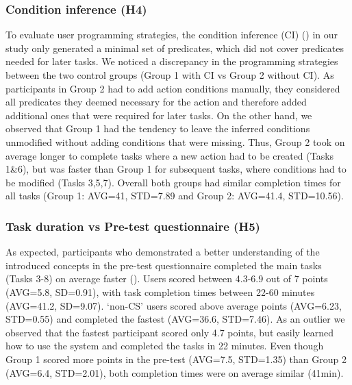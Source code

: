 \subsubsection*{Condition inference (H4)} 
To evaluate user programming strategies, the condition inference (CI) () in our study only generated a minimal set of predicates, which did not cover predicates needed for later tasks.
We noticed a discrepancy in the programming strategies between the two control groups (Group 1 with CI vs Group 2 without CI).
As participants in Group 2 had to add action conditions manually, they considered all predicates they deemed necessary for the action and therefore added additional ones that were required for later tasks.
On the other hand, we observed that Group 1 had the tendency to leave the inferred conditions unmodified without adding conditions that were missing.
Thus, Group 2 took on average longer to complete tasks where a new action had to be created (Tasks 1\&6), but was faster than Group 1 for subsequent tasks, where conditions had to be modified (Tasks 3,5,7).
Overall both groups had similar completion times for all tasks (Group 1: AVG=41, STD=7.89 and Group 2: AVG=41.4, STD=10.56).

\subsubsection*{Task duration vs Pre-test questionnaire (H5)} 
As expected, participants who demonstrated a better understanding of the introduced concepts in the pre-test questionnaire completed the main tasks (Tasks 3-8) on average faster ().
Users scored between 4.3-6.9 out of 7 points (AVG=5.8, SD=0.91), with task completion times between 22-60 minutes (AVG=41.2, SD=9.07).
`non-CS' users scored above average points (AVG=6.23, STD=0.55) and completed the fastest (AVG=36.6, STD=7.46).
As an outlier we observed that the fastest participant scored only 4.7 points, but easily learned how to use the system and completed the tasks in 22 minutes.
Even though Group 1 scored more points in the pre-test (AVG=7.5, STD=1.35) than Group 2 (AVG=6.4, STD=2.01), both completion times were on average similar (41min).

